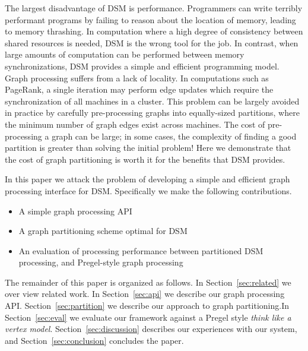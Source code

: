 The largest disadvantage of DSM is performance. Programmers can write
terribly performant programs by failing to reason about the location
of memory, leading to memory thrashing. In computation where a high
degree of consistency between shared resources is needed, DSM is the 
wrong tool for the job. In contrast, when large amounts of computation can be
performed between memory synchronizations, DSM provides a simple and
efficient programming model. Graph processing suffers from a lack of
locality. In computations such as PageRank, a single iteration may
perform edge updates which require the synchronization of all
machines in a cluster. This problem can be largely avoided in practice
by carefully pre-processing graphs into equally-sized partitions, where 
the minimum number of graph edges exist across machines. The cost of pre-processing a
graph can be large; in some cases, the complexity of finding a good
partition is greater than solving the initial problem! Here we
demonstrate that the cost of graph partitioning is worth it for the
benefits that DSM provides.

In this paper we attack the problem of developing a simple and
efficient graph processing interface for DSM. Specifically we make the
following contributions.

\begin{itemize}
        \item A simple graph processing API
        \item A graph partitioning scheme optimal for DSM
        \item An evaluation of processing performance between partitioned DSM processing, and Pregel-style graph processing
\end{itemize}

The remainder of this paper is organized as follows. In
Section~\ref{sec:related} we over view related work. In
Section~\ref{sec:api} we describe our graph processing API.
Section~\ref{sec:partition} we describe our approach to graph
partitioning.In Section~\ref{sec:eval} we evaluate our framework
against a Pregel style \textit{think like a vertex model}.
Section~\ref{sec:discussion} describes our experiences with our
system, and Section~\ref{sec:conclusion} concludes the paper.




